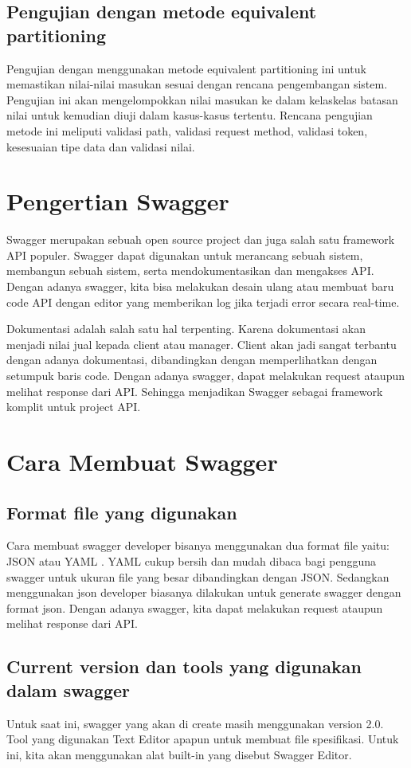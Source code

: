 \subsection {Pengujian dengan metode equivalent partitioning}
Pengujian dengan menggunakan metode equivalent partitioning ini untuk memastikan nilai-nilai masukan sesuai dengan rencana pengembangan sistem. Pengujian ini akan mengelompokkan nilai masukan ke dalam kelaskelas batasan nilai untuk kemudian diuji dalam kasus-kasus tertentu. Rencana pengujian metode ini meliputi validasi path, validasi request method, validasi token, kesesuaian tipe data dan validasi nilai.

\section{Pengertian Swagger}
Swagger merupakan sebuah open source project dan juga salah satu framework API populer. Swagger dapat digunakan untuk merancang sebuah sistem, membangun sebuah sistem, serta mendokumentasikan dan mengakses API. Dengan adanya swagger, kita bisa melakukan desain ulang atau membuat baru code API dengan editor yang memberikan log jika terjadi error secara real-time.

Dokumentasi adalah salah satu hal terpenting. Karena dokumentasi akan menjadi nilai jual kepada client atau manager. Client akan jadi sangat terbantu dengan adanya dokumentasi, dibandingkan dengan memperlihatkan dengan setumpuk baris code. Dengan adanya swagger, dapat melakukan request ataupun melihat response dari API. Sehingga menjadikan Swagger sebagai framework komplit untuk project API.
\section{Cara Membuat Swagger}
\subsection{Format file yang digunakan}
Cara membuat swagger developer bisanya menggunakan dua format file yaitu: JSON atau YAML . YAML cukup bersih dan mudah dibaca bagi pengguna swagger untuk ukuran file yang besar dibandingkan dengan JSON. Sedangkan menggunakan json developer biasanya dilakukan untuk generate swagger dengan format json. Dengan adanya swagger, kita dapat melakukan request ataupun melihat response dari API.
\subsection{Current version dan tools yang digunakan dalam swagger}
Untuk saat ini, swagger yang akan di create masih menggunakan version 2.0.
Tool yang digunakan Text Editor apapun untuk membuat file spesifikasi. Untuk ini, kita akan menggunakan alat built-in yang disebut Swagger Editor.
